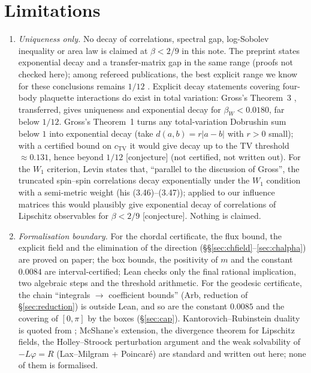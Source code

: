 \documentclass[11pt,a4paper]{article}
\theoremstyle{remark}
\theoremstyle{definition}
\newcommand{\st}[1]{\textsf{[#1]}}
\begin{document}
\section{Limitations}\label{sec:limits}
\begin{enumerate}
\item \emph{Uniqueness only.} No decay of correlations, spectral gap, log-Sobolev inequality or area law is
claimed at $\beta<2/9$ in this note. The preprint \cite{BB26} states exponential decay and a transfer-matrix gap
in the same range (proofs not checked here); among refereed publications, the best explicit range we know for
these conclusions remains $1/12$ \cite{SZZ23}. Explicit decay statements covering four-body plaquette interactions do exist in total
variation: Gross's Theorem~3 \cite{Gro79}, transferred, gives uniqueness and exponential decay for
$\beta_W<0.0180$, far below $1/12$. Gross's Theorem~1 \cite[p.~11]{Gro79} turns any total-variation Dobrushin sum
below $1$ into exponential decay (take $d(a,b)=r|a-b|$ with $r>0$ small); with a certified bound on $c_{\mathrm{TV}}$
it would give decay up to the TV threshold $\approx0.131$, hence beyond $1/12$ \st{conjecture} (not certified,
not written out). For the $W_1$ criterion, Levin \cite[Remark~3.5, p.~72]{Lev80} states that, ``parallel to the
discussion of Gross'', the truncated spin--spin correlations decay exponentially under the $W_1$ condition with a
semi-metric weight (his (3.46)--(3.47)); applied to our influence matrices this would plausibly give exponential
decay of correlations of Lipschitz observables for $\beta<2/9$ \st{conjecture}. Nothing is claimed.
\item \emph{Formalisation boundary.} For the chordal certificate, the flux bound, the explicit field and the
elimination of the direction (\S\S\ref{sec:chfield}--\ref{sec:chalpha}) are proved on paper; the box bounds, the
positivity of $m$ and the constant $0.0084$ are interval-certified; Lean checks only the final rational
implication, two algebraic steps and the threshold arithmetic. For the geodesic certificate, the chain
``integrals $\to$ coefficient bounds'' (Arb, reduction of \S\ref{sec:reduction}) is outside Lean, and so are the
constant $0.0085$ and the covering of $[0,\pi]$ by the boxes (\S\ref{sec:cap}). Kantorovich--Rubinstein duality is
quoted from \cite[Thm~10.8, p.~53]{DS25}; McShane's extension, the divergence theorem for Lipschitz fields, the
Holley--Stroock perturbation argument \cite{HS87} and the weak solvability of $-L\varphi=R$ (Lax--Milgram +
Poincar\'e) are standard and written out here; none of them is formalised.

\end{enumerate}
\end{document}
